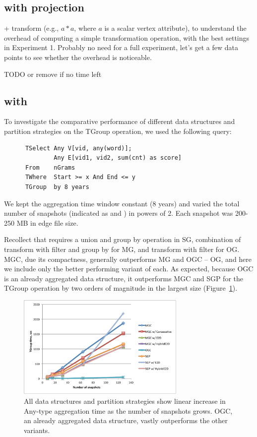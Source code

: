 \subsection{ with projection}

 + transform (e.g., $a * a$, where $a$ is a
  scalar vertex attribute), to understand the overhead of computing a
  simple transformation operation, with the best settings in
  Experiment 1.  Probably no need for a full experiment,
  let's get a few data points to see whether the overhead is
  noticeable.

TODO or remove if no time left

\subsection{ with }

To investigate the comparative performance of different data
structures and partition strategies on the TGroup operation, we used
the following query:

\begin{small}
\begin{verbatim}
      TSelect Any V[vid, any(word)];
              Any E[vid1, vid2, sum(cnt) as score]
      From    nGrams
      TWhere  Start >= x And End <= y
      TGroup  by 8 years
\end{verbatim}
\end{small}

We kept the aggregation time window constant (8 years) and varied the
total number of snapshots (indicated as  and ) in
powers of 2.  Each snapshot was 200-250 MB in edge file size.

Recollect that  requires a union and group by operation
in SG, combination of transform with filter and group by for MG, and
transform with filter for OG.  MGC, due its compactness, generally
outperforms MG and OGC -- OG, and here we include only the better
performing variant of each.  As expected, because OGC is an already
aggregated data structure, it outperforms MGC and SGP for the TGroup
operation by two orders of magnitude in the largest size
(Figure~\ref{fig:tgroupe}).

\begin{figure}[t!]
\includegraphics[width=3.2in]{figs/tgroupe_warm.pdf}
\caption{All data structures and partition strategies show linear
  increase in Any-type aggregation time as the number of snapshots
  grows.  OGC, an already aggregated data structure, vastly
  outperforms the other variants.}
\label{fig:tgroupe}
\end{figure}

